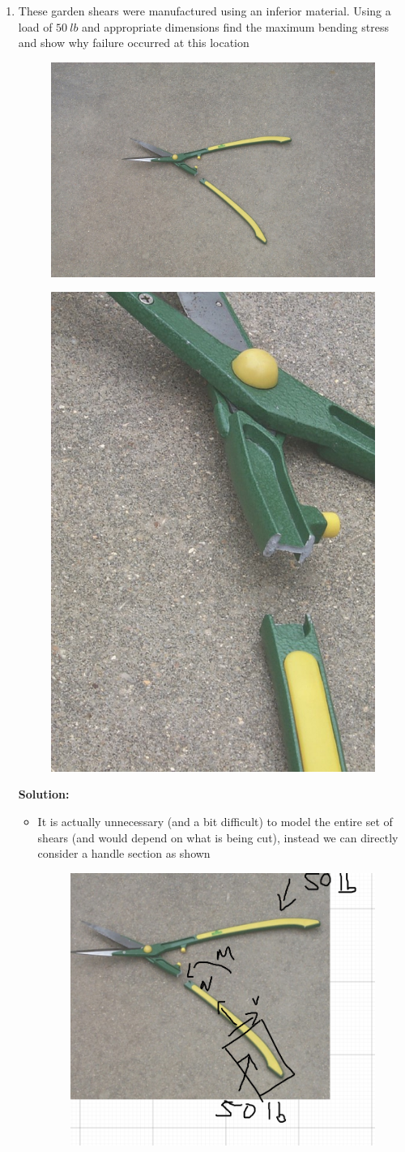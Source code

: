\documentclass[12pt, oneside]{article}
\let\US\SI
\begin{document}
\begin{enumerate}
	\item %
		These garden shears were manufactured using an inferior material.
		Using a load of $\US{50}{lb}$ and appropriate dimensions find the maximum bending stress and show why failure occurred at this location
		\begin{figure}[H]
			\centering
			\includegraphics[width=0.7\linewidth]{c6-4a}
		\end{figure}
		\begin{figure}[H]
			\centering
			\includegraphics[width=0.4\linewidth]{c6-4b}
		\end{figure}
			\textbf{Solution:}
			\begin{itemize}
				\item It is actually unnecessary (and a bit difficult) to model the entire set of shears (and would depend on what is being cut), instead we can directly consider a handle section as shown
					\begin{figure}[H]
						\centering
						\includegraphics[width=0.6\linewidth]{5-7}

\end{figure}
\end{itemize}
\end{enumerate}
\end{document}
